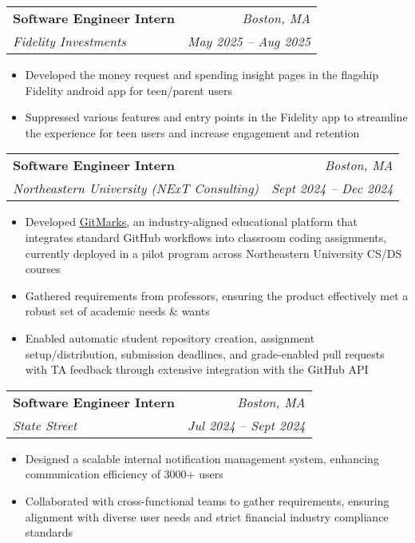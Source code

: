 \documentclass[letterpaper,11pt]{article}
\makeatletter
\newcommand{\resumeItem}[1]{
  \item\small{
    {#1 \vspace{-2.pt}}
  }
}
\newcommand{\resumeSubheading}[4]{
  \vspace{-3pt}\item
    \begin{tabular*}{0.97\textwidth}[t]{l@{\extracolsep{\fill}}r}
    \vspace{-2pt}
      \textbf{#1} & \textit{#2} \\
      \textit{\small#3} & \textit{\small #4} \\
    \end{tabular*}\vspace{-7pt}
}
\newcommand{\resumeItemListStart}{\begin{itemize}}
\newcommand{\resumeItemListEnd}{\end{itemize}\vspace{-5pt}}
\makeatother
\begin{document}
  \resumeSubheading
      {Software Engineer Intern}{Boston, MA}
      {Fidelity Investments}{May 2025 -- Aug 2025}
      \resumeItemListStart
            \resumeItem{Developed the money request and spending insight pages in the flagship Fidelity android app for teen/parent users}
            \resumeItem{Suppressed various features and entry points in the Fidelity app to streamline the experience for teen users and increase engagement and retention}
        \resumeItemListEnd
    \vspace{4pt}

    \resumeSubheading
        {Software Engineer Intern}{Boston, MA}
        {Northeastern University (NExT Consulting)}{Sept 2024 -- Dec 2024}
        \resumeItemListStart
            \resumeItem{Developed \href{https://github.com/NUSpecialProjects/gitmarks}{\underline{GitMarks}}, an industry-aligned educational platform that integrates standard GitHub workflows into classroom coding assignments, currently deployed in a pilot program across Northeastern University CS/DS courses}
            \resumeItem{Gathered requirements from professors, ensuring the product effectively met a robust set of academic needs \& wants}
            \resumeItem{Enabled automatic student repository creation, assignment setup/distribution, submission deadlines, and grade-enabled pull requests with TA feedback through extensive integration with the GitHub API}
        \resumeItemListEnd
    \vspace{1pt}

    \resumeSubheading
      {Software Engineer Intern}{Boston, MA}
      {State Street}{Jul 2024 -- Sept 2024}
      \resumeItemListStart
        \resumeItem{Designed a scalable internal notification management system, enhancing communication efficiency of 3000+ users}
        \resumeItem{Collaborated with cross-functional teams to gather requirements, ensuring alignment with diverse user needs and strict financial industry compliance standards}
      \resumeItemListEnd
    \vspace{1pt}
    
\end{document}
